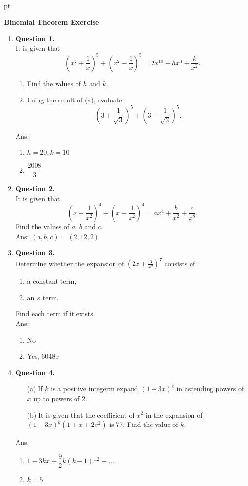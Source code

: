 \documentclass[12pt]{article}
\begin{document}
 pt
\begin{center}
	{\large \bf Binomial Theorem Exercise}\\
	\vspace{2 mm}

\end{center}
\vspace{0.05cm}

\begin{enumerate}
	\item {\bf Question 1.}\\
	It is given that $$\displaystyle\left(x^2+\frac{1}{x}\right)^5+\left(x^2-\frac{1}{x}\right)^5 = 2x^{10}+hx^4+\frac{k}{x^2}.$$
	\begin{enumerate}
		\item Find the values of $h$ and $k$.
		\item Using the result of (a), evaluate $$\displaystyle\left(3+\frac{1}{\sqrt{3}}\right)^5+\left(3-\frac{1}{\sqrt{3}}\right)^5.$$
	\end{enumerate}
	Ans:
	\begin{enumerate}
		\item $h=20,k=10$
		\item $\dfrac{2008}{3}$
	\end{enumerate}
	
	\item {\bf Question 2.}\\
	It is given that $$\displaystyle\left(x+\frac{1}{x^2}\right)^4+\left(x-\frac{1}{x^2}\right)^4 = ax^{4}+\frac{b}{x^2}+\frac{c}{x^8}.$$ Find the values of $a$, $b$ and $c$.\\
	Ans: $(a,b,c) = (2,12,2)$

	\item {\bf Question 3.}\\
	Determine whether the expansion of $\displaystyle\left(2x+\frac{3}{x^2}\right)^7$ consists of 
	\begin{enumerate}
		\item a constant term,
		\item an $x$ term.
	\end{enumerate}
	Find each term if it exists.\\
	Ans:
	\begin{enumerate}
		\item No
		\item Yes, $6048x$
	\end{enumerate}

	\item {\bf Question 4.}
	\begin{enumerate}
		\item [(a)] If $k$ is a positive integerm expand $(1-3x)^k$ in ascending powers of $x$ up to powers of 2.
 		\item [(b)] It is given that the coefficient of $x^2$ in the expansion of $(1-3x)^k(1+x+2x^2)$ is 77. Find the value of $k$. 
	\end{enumerate}
	Ans:
	\begin{enumerate}
		\item $1-3kx+\dfrac{9}{2}k(k-1)x^2 + \ldots$
		\item $k = 5$
	\end{enumerate}


\end{enumerate}
\end{document}

